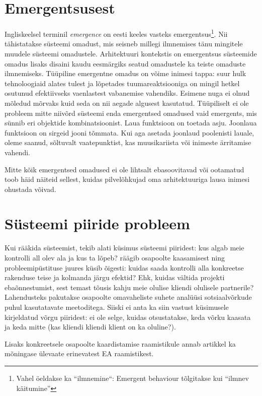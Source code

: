 \section{Emergentsusest}
Ingliskeelsel terminil \emph{emergence} on eesti keeles vasteks emergentsus\footnote{Vahel öeldakse ka ``ilmnemine``: Emergent behaviour tõlgitakse kui \enquote{ilmnev käitumine}}. Nii tähistatakse süsteemi omadust, mis seisneb millegi ilmnemises tänu mingitele muudele süsteemi omadustele. Arhitektuuri kontekstis on emergentsus süsteemide omadus lisaks disaini kaudu eesmärgiks seatud omadustele ka teiste omaduste ilmnemiseks. Tüüpiline emergentne omadus on võime inimesi tappa: suur hulk tehnoloogiaid alates tulest ja lõpetades tuumareaktsiooniga on mingil hetkel osutunud efektiivseks vaenlastest vabanemise vahendiks. Esimene nuga ei olnud mõledud mõrvaks kuid seda on nii aegade algusest kasutatud. Tüüpiliselt ei ole probleem mitte niivõrd süsteemi enda emergentsed omadused vaid emergents, mis sünnib eri objektide kombinatsioonist. Laua funktsioon on toetada asju. Joonlaua funktsioon on sirgeid jooni tõmmata. Kui aga asetada joonlaud poolenisti lauale, oleme saanud, sõltuvalt vaatepunktist, kas muusikariista või inimeste ärritamise vahendi. 

Mitte kõik emergentsed omadused ei ole lihtsalt ebasoovitavad või ootamatud \cite{emergence} toob häid näiteid sellest, kuidas pilvelõhkujad oma arhitektuuriga lausa inimesi ohustada võivad.

\section{Süsteemi piiride probleem}
\label{sec:boundary}
Kui rääkida süsteemist, tekib alati küsimus süsteemi piiridest: kus algab meie kontrolli all olev ala ja kus ta lõpeb? \cite{wood2013framework} räägib osapoolte kaasamisest ning probleemipüstituse juures küsib õigesti: kuidas saada kontrolli alla konkreetse rakenduse teise ja kolmanda järgu efektid? Ehk, kuidas vältida projekti ebaõnnestumist, sest temast tõusis kahju meie olulise kliendi olulisele partnerile? Lahendusteks pakutakse osapoolte omavaheliste suhete analüüsi sotsiaalvõrkude puhul kasutatavate meetoditega. Siiski ei anta ka siin vastust küsimusele kirjeldatud võrgu piiridest: ei ole selge, kuidas otsustatakse, keda võrku kaasata ja keda mitte (kas kliendi kliendi klient on ka oluline?). 

Lisaks konkreetsele osapoolte kaardistamise raamistikule annab artikkel ka mõningase ülevaate erinevatest EA raamistikest.

